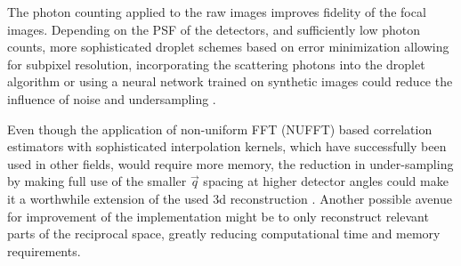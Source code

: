 The photon counting applied to the raw images improves fidelity of the focal images. Depending on the PSF of the detectors, and sufficiently low photon counts, more sophisticated droplet schemes based on error minimization allowing for subpixel resolution, incorporating the scattering photons into the droplet algorithm or using a neural network trained on synthetic images could reduce the influence of noise and undersampling \cite{baumann2018,collaboration2014,schayck2020,sun2020}.

Even though the application of non-uniform FFT (NUFFT) based correlation estimators with sophisticated interpolation kernels, which have  successfully been used in other fields, would require more memory, the reduction in under-sampling by making full use of the smaller $\vec{q}$ spacing at higher detector angles could make it a worthwhile extension of the used 3d reconstruction \cite{laguna1998,yang2008,chang2020}. Another possible avenue for improvement of the implementation might be to only reconstruct relevant parts of the reciprocal space, greatly reducing computational time and memory requirements. 



